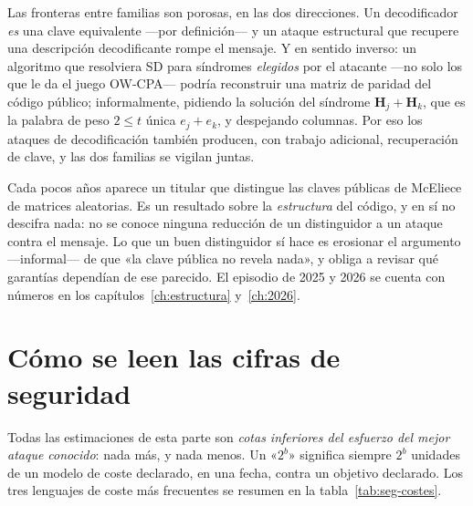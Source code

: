 \documentclass[11pt,a4paper,oneside]{report}
\newcommand{\Hmat}{\mathbf{H}}          %
\begin{document}
Las fronteras entre familias son porosas, en las dos direcciones. Un
decodificador \emph{es} una clave equivalente ---por definición--- y
un ataque estructural que recupere una descripción decodificante
rompe el mensaje. Y en sentido inverso: un algoritmo que resolviera
SD para síndromes \emph{elegidos} por el atacante ---no solo los que
le da el juego OW-CPA--- podría reconstruir una matriz de paridad del
código público; informalmente, pidiendo la solución del síndrome
$\Hmat_j+\Hmat_k$, que es la palabra de peso $2\le t$ única
$e_j+e_k$, y despejando columnas. Por eso los ataques de
decodificación también producen, con trabajo adicional, recuperación
de clave, y las dos familias se vigilan juntas.

\begin{trampa}
Cada pocos años aparece un titular que distingue las claves públicas
de McEliece de matrices aleatorias. Es un resultado sobre la
\emph{estructura} del código, y en sí no descifra nada: no se conoce
ninguna reducción de un distinguidor a un ataque contra el mensaje.
Lo que un buen distinguidor sí hace es erosionar el argumento
---informal--- de que «la clave pública no revela nada», y obliga a
revisar qué garantías dependían de ese parecido. El episodio de 2025
y 2026 se cuenta con números en los
capítulos~\ref{ch:estructura} y~\ref{ch:2026}.
\end{trampa}

\section{Cómo se leen las cifras de seguridad}

Todas las estimaciones de esta parte son \emph{cotas inferiores del
esfuerzo del mejor ataque conocido}: nada más, y nada menos. Un
«$2^b$» significa siempre $2^b$ unidades de un modelo de coste
declarado, en una fecha, contra un objetivo declarado. Los tres
lenguajes de coste más frecuentes se resumen en la
tabla~\ref{tab:seg-costes}.
\end{document}
